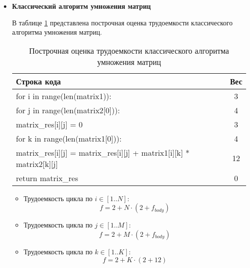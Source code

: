 \begin{itemize}
    \item \textbf{Классический алгоритм умножения матриц}
    
    В таблице \ref{tbl:classic} представлена построчная оценка трудоемкости классического алгоритма умножения матриц.
    \begin{table}[h]
    \begin{center}
        \begin{threeparttable}
        \captionsetup{justification=raggedright}
        \caption{\label{tbl:classic}Построчная оценка трудоемкости классического алгоритма умножения матриц}
        \begin{tabular}{|l|c|}
            \hline
            Строка кода & Вес \\
            \hline
            for i in range(len(matrix1)): & 3 \\ 
            \hline
            for j in range(len(matrix2[0])): & 4 \\ 
            \hline
            matrix\_res[i][j] = 0 & 3 \\ 
            \hline
            for k in range(len(matrix1[0])): & 4 \\ 
            \hline
            matrix\_res[i][j] = matrix\_res[i][j] + matrix1[i][k] * matrix2[k][j] & 12 \\ 
            \hline
            return matrix\_res & 0 \\ 
            \hline
		\end{tabular}
        \end{threeparttable}
    \end{center}
    \end{table}

    \FloatBarrier
    
    \begin{itemize}
        \item Трудоемкость цикла по $i \in [1..N]$: 
            \begin{equation}
                f = 2 + N \cdot (2 + f_{body})
            \end{equation}
        \item Трудоемкость цикла по $j \in [1..M]$:
            \begin{equation}
                f = 2 + M \cdot (2 + f_{body})
            \end{equation}
        \item Трудоемкость цикла по $k \in [1..K]$:
            \begin{equation}
                f = 2 + K \cdot (2 + 12)
            \end{equation}
    \end{itemize}
    

\end{itemize}
